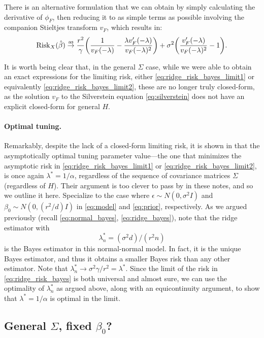 \documentclass{article}
\begin{document}
There is an alternative formulation that we can obtain by simply calculating the 
derivative of $\phi_F$, then reducing it to as simple terms as possible
involving the companion Stieltjes transform $v_F$, which results in:     
\begin{equation}
\label{eq:ridge_risk_bayes_limit2}
\mathrm{Risk}_X(\hat{\beta}) \overset{\mathrm{as}}{\to} \frac{r^2}{\gamma} \bigg( \frac{1}{v_F(-\lambda)} -
  \frac{\lambda v'_F(-\lambda)}{v_F(-\lambda)^2} \bigg) + \sigma^2 \bigg( 
  \frac{v'_F(-\lambda)}{v_F(-\lambda)^2} - 1 \bigg).
\end{equation}

It is worth being clear that, in the general $\Sigma$ case, while we were able
to obtain an exact expressions for the limiting risk, either
\eqref{eq:ridge_risk_bayes_limit1} or equivalently
\eqref{eq:ridge_risk_bayes_limit2}, these are no longer truly closed-form, as
the solution $v_F$ to the Silverstein equation \eqref{eq:silverstein} does not
have an explicit closed-form for general $H$.  

\paragraph{Optimal tuning.}

Remarkably, despite the lack of a closed-form limiting risk, it is shown in
\citet{dobriban2018high} that the asymptotically optimal tuning parameter
value---the one that minimizes the asymptotic risk in
\eqref{eq:ridge_risk_bayes_limit1} or \eqref{eq:ridge_risk_bayes_limit2}, is
once again $\lambda^* = 1/\alpha$, regardless of the sequence of covariance
matrices $\Sigma$ (regardless of $H$). Their argument is too clever to pass by
in these notes, and so we outline it here. Specialize to the case where
$\epsilon \sim N(0,\sigma^2 I)$ and $\beta_0 \sim N(0, (r^2/d) I)$ in
\eqref{eq:model} and \eqref{eq:prior}, respectively. As we argued previously
(recall \eqref{eq:normal_bayes}, \eqref{eq:ridge_bayes}), note that the ridge
estimator with
\[
\lambda^*_n = (\sigma^2 d)/(r^2 n)
\]
is the Bayes estimator in this normal-normal model. In fact, it is the unique
Bayes estimator, and thus it obtains a smaller Bayes risk than any other
estimator. Note that $\lambda^*_n \to \sigma^2 \gamma / r^2= \lambda^*$. Since 
the limit of the risk in \eqref{eq:ridge_risk_bayes} is both universal and
almost sure, we can use the optimality of $\lambda^*_n$ as argued above, along
with an equicontinuity argument, to show that $\lambda^* = 1/\alpha$ is optimal
in the limit.  

\subsection{General $\Sigma$, fixed $\beta_0$?}
\end{document}
